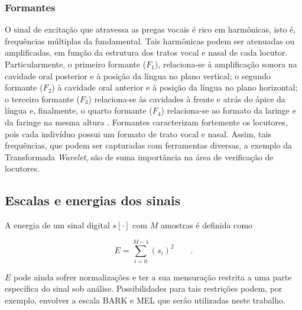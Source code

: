 		\subsubsection{Formantes}
			\par O sinal de excitação que atravessa as pregas vocais é rico em harmônicas, isto é, frequências múltiplas da fundamental. Tais harmônicas podem ser atenuadas ou amplificadas, em função da estrutura dos tratos vocal e nasal de cada locutor. Particularmente, o primeiro formante ($F_1$), relaciona-se à  amplificação  sonora  na  cavidade  oral  posterior  e  à  posição  da  língua  no  plano  vertical;  o segundo  formante  ($F_2$)  à  cavidade  oral  anterior  e  à  posição  da  língua  no  plano  horizontal; o terceiro  formante  ($F_3$)  relaciona-se  às  cavidades  à  frente  e  atrás  do  ápice  da  língua e, finalmente,  o  quarto formante  ($F_4$) relaciona-se  ao  formato  da  laringe  e  da  faringe  na  mesma  altura  \cite{valencca2014analise}. Formantes caracterizam fortemente os locutores, pois cada indivíduo possui um formato de trato vocal e nasal. Assim, tais frequências, que podem ser capturadas com ferramentas diversas, a exemplo da Transformada \textit{Wavelet}, são de suma importância na área de verificação de locutores.
	
		\subsection{Escalas e energias dos sinais}
			\par A energia de um sinal digital $s[\cdot]$ com $M$ amostras é definida como
			
			\begin{equation}
				E = \sum\limits_{i=0}^{M-1}(s_i)^2 \qquad.   
			\end{equation}
			
			$E$ pode ainda sofrer normalizações e ter a sua mensuração restrita a uma parte específica do sinal sob análise. Possibilidades para tais restrições podem, por exemplo, envolver a escala BARK \cite{doi:10.1121-1.1908630} e MEL \cite{beranek1949acoustic} que serão utilizadas neste trabalho.
